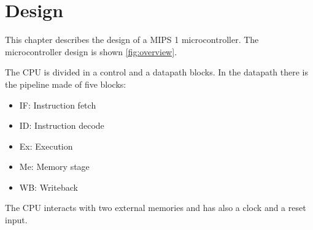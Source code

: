 \chapter{Design}
This chapter describes the design of a MIPS 1 microcontroller. The microcontroller design is shown \autoref{fig:overview}.

\begin{figure}[h]
\end{figure}

The CPU is divided in a control and a datapath blocks. In the datapath there is the pipeline made of five blocks:
\begin{itemize}
 \item IF: Instruction fetch
 \item ID: Instruction decode
 \item Ex: Execution
 \item Me: Memory stage
 \item WB: Writeback
\end{itemize}

The CPU interacts with two external memories and has also a clock and a reset input.

	
	